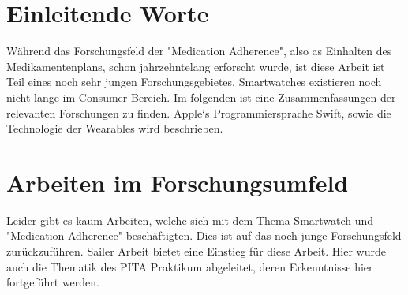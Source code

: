 

\section{Einleitende Worte}
Während das Forschungsfeld der "Medication Adherence", also as Einhalten des Medikamentenplans, schon jahrzehntelang erforscht wurde, ist diese Arbeit ist Teil eines noch sehr jungen Forschungsgebietes. Smartwatches existieren noch nicht lange im Consumer Bereich. Im folgenden ist eine Zusammenfassungen der relevanten Forschungen zu finden. Apple`s Programmiersprache Swift, sowie die Technologie der Wearables wird beschrieben.
\section{Arbeiten im Forschungsumfeld}
Leider gibt es kaum Arbeiten, welche sich mit dem Thema Smartwatch und "Medication Adherence" beschäftigten. Dies ist auf das noch junge Forschungsfeld zurückzuführen. Sailer Arbeit \cite{Fabian-Sailer:2015aa} bietet eine Einstieg für diese Arbeit. Hier wurde auch die Thematik des PITA Praktikum abgeleitet, deren Erkenntnisse hier fortgeführt werden. 

